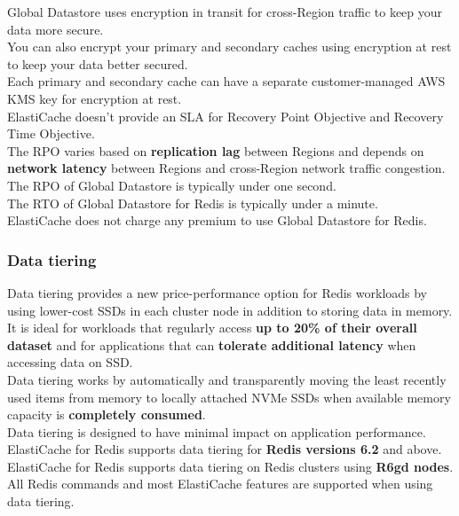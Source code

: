 \documentclass[12pt, letterpaper, twoside]{article}
\begin{document}
Global Datastore uses encryption in transit for cross-Region traffic to keep your data more secure.\\
You can also encrypt your primary and secondary caches using encryption at rest to keep your data better secured.\\
Each primary and secondary cache can have a separate customer-managed AWS KMS key for encryption at rest.\\

ElastiCache doesn’t provide an SLA for Recovery Point Objective and Recovery Time Objective.\\
The RPO varies based on \textbf{replication lag} between Regions and depends on \textbf{network latency} between Regions and 
cross-Region network traffic congestion.\\
The RPO of Global Datastore is typically under one second.\\
The RTO of Global Datastore for Redis is typically under a minute.\\

ElastiCache does not charge any premium to use Global Datastore for Redis.\\

\subsubsection{Data tiering}
Data tiering provides a new price-performance option for Redis workloads by using lower-cost SSDs in each cluster node 
in addition to storing data in memory.\\
It is ideal for workloads that regularly access \textbf{up to 20\% of their overall dataset} and for applications that 
can \textbf{tolerate additional latency} when accessing data on SSD.\\

Data tiering works by automatically and transparently moving the least recently used items from memory to locally attached 
NVMe SSDs when available memory capacity is \textbf{completely consumed}.\\

Data tiering is designed to have minimal impact on application performance.\\

ElastiCache for Redis supports data tiering for \textbf{Redis versions 6.2} and above.
ElastiCache for Redis supports data tiering on Redis clusters using \textbf{R6gd nodes}.
All Redis commands and most ElastiCache features are supported when using data tiering.\\
\end{document}
